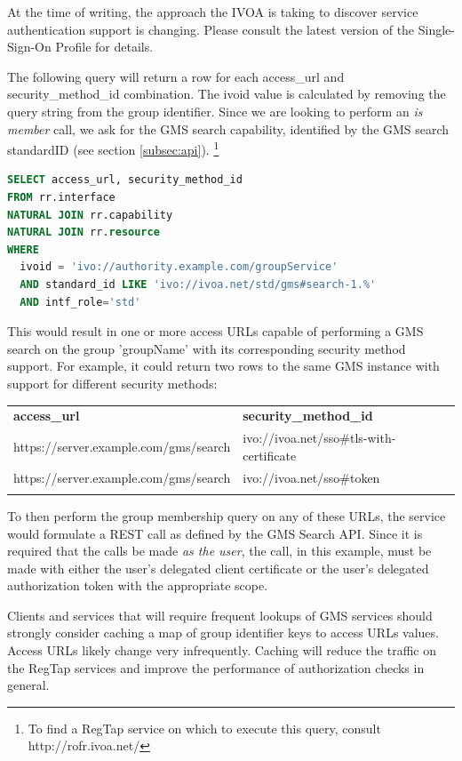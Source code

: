 \documentclass[11pt,a4paper]{ivoa}
\begin{document}
At the time of writing, the approach the IVOA is taking to discover service authentication support is changing.  Please consult the latest version of the Single-Sign-On Profile for details.

The following query will return a row for each access\_url and security\_method\_id combination.  The ivoid value is calculated by removing the query string from the group identifier.  Since we are looking to perform an \emph{is member} call, we ask for the GMS search capability, identified by the GMS search standardID (see section \ref{subsec:api}). \footnote{To find a RegTap service on which to execute this query, consult http://rofr.ivoa.net/}

\begin{lstlisting}[language=SQL,xleftmargin=2em]
SELECT access_url, security_method_id
FROM rr.interface
NATURAL JOIN rr.capability
NATURAL JOIN rr.resource
WHERE
  ivoid = 'ivo://authority.example.com/groupService'
  AND standard_id LIKE 'ivo://ivoa.net/std/gms#search-1.%'
  AND intf_role='std'
\end{lstlisting}

This would result in one or more access URLs capable of performing a GMS search on the group 'groupName' with its corresponding security method support.  For example, it could return two rows to the same GMS instance with support for different security methods:

\vspace{3mm}
\hskip-1.0cm
\begin{tabular}{l l}
\textbf{access\_url} & \textbf{security\_method\_id} \\
\sptablerule
https://server.example.com/gms/search & ivo://ivoa.net/sso\#tls-with-certificate \\
https://server.example.com/gms/search & ivo://ivoa.net/sso\#token \\
\sptablerule
\end{tabular}
\vspace{3mm}

To then perform the group membership query on any of these URLs, the service would formulate a REST call as defined by the GMS Search API.  Since it is required that the calls be made \emph{as the user}, the call, in this example, must be made with either the user's delegated client certificate or the user's delegated authorization token with the appropriate scope.

Clients and services that will require frequent lookups of GMS services should strongly consider caching a map of group identifier keys to access URLs values. Access URLs likely change very infrequently.  Caching will reduce the traffic on the RegTap services and improve the performance of authorization checks in general.
\end{document}
